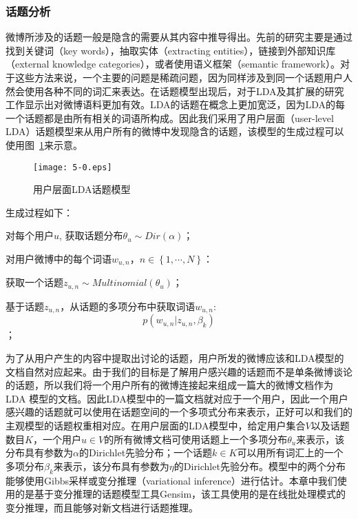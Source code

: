 \begin{landscape}
\subsubsection{话题分析}
\label{topic}
微博所涉及的话题一般是隐含的需要从其内容中推导得出。先前的研究主要是通过找到关键词（key words），抽取实体（extracting  entities），链接到外部知识库（external knowledge categories），或者使用语义框架（semantic framework）。对于这些方法来说，一个主要的问题是稀疏问题，因为同样涉及到同一个话题用户人然会使用各种不同的词汇来表达。在话题模型出现后，对于LDA及其扩展的研究工作显示出对微博语料更加有效。LDA的话题在概念上更加宽泛，因为LDA的每一个话题都是由所有相关的词语所构成。因此我们采用了用户层面（user-level LDA）话题模型来从用户所有的微博中发现隐含的话题，该模型的生成过程可以使用图~\ref{fig5-1}来示意。

\begin{figure}[htb]
\centering
\texttt{[image: 5-0.eps]}
\caption{用户层面LDA话题模型}
\label{fig5-1}
\end{figure}

生成过程如下：
\begin{itemize*}
\item 对每个用户$ u $, 获取话题分布$ \theta_{u} \sim Dir \left(  \alpha \right) $；
\item 对用户微博中的每个词语$ w_{u,n} $，$ n \in \left\lbrace 1, \cdots, N \right\rbrace $：
\begin{itemize*}
\item 获取一个话题$ z_{u,n} \sim Multinomial \left( \theta_{u}  \right) $；
\item 基于话题$ z_{u,n} $，从话题的多项分布中获取词语$ w_{u,n} $:\\ 
$$  p \left( w_{u,n} \vert z_{u,n}, \beta_{k}  \right) $$；
\end{itemize*}
\end{itemize*}

为了从用户产生的内容中提取出讨论的话题，用户所发的微博应该和LDA模型的文档自然对应起来。由于我们的目标是了解用户感兴趣的话题而不是单条微博谈论的话题，所以我们将一个用户所有的微博连接起来组成一篇大的微博文档作为LDA 模型的文档。因此LDA模型中的一篇文档就对应于一个用户，因此一个用户感兴趣的话题就可以使用在话题空间的一个多项式分布来表示，正好可以和我们的主观模型的话题权重相对应。在用户层面的LDA模型中，给定用户集合$ V $以及话题数目$ K $，一个用户$ u \in V $的所有微博文档可使用话题上一个多项分布$ \theta_{u} $来表示，该分布具有参数为$ \alpha $的Dirichlet先验分布；一个话题$ k \in K $可以用所有词汇上的一个多项分布$ \beta_{k} $来表示，该分布具有参数为$ \eta $的Dirichlet先验分布。模型中的两个分布能够使用Gibbs采样或变分推理（variational inference）进行估计。本章中我们使用的是基于变分推理的话题模型工具Gensim，该工具使用的是在线批处理模式的变分推理，而且能够对新文档进行话题推理。


\end{landscape}
